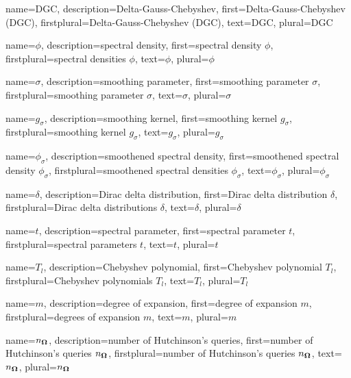 {%
  name={DGC},%
  description={Delta-Gauss-Chebyshev},%
  first={Delta-Gauss-Chebyshev (DGC)},%
  firstplural={Delta-Gauss-Chebyshev (DGC)},%
  text={DGC},%
  plural={DGC}%
}


{%
  name={$\phi$},%
  description={spectral density},%
  first={spectral density $\phi$},%
  firstplural={spectral densities $\phi$},%
  text={$\phi$},%
  plural={$\phi$}%
}

{%
  name={$\sigma$},%
  description={smoothing parameter},%
  first={smoothing parameter $\sigma$},%
  firstplural={smoothing parameter $\sigma$},%
  text={$\sigma$},%
  plural={$\sigma$}%
}

{%
  name={$g_{\sigma}$},%
  description={smoothing kernel},%
  first={smoothing kernel $g_{\sigma}$},%
  firstplural={smoothing kernel $g_{\sigma}$},%
  text={$g_{\sigma}$},%
  plural={$g_{\sigma}$}%
}

{%
  name={$\phi_{\sigma}$},%
  description={smoothened spectral density},%
  first={smoothened spectral density $\phi_{\sigma}$},%
  firstplural={smoothened spectral densities $\phi_{\sigma}$},%
  text={$\phi_{\sigma}$},%
  plural={$\phi_{\sigma}$}%
}

{%
  name={$\delta$},%
  description={Dirac delta distribution},%
  first={Dirac delta distribution $\delta$},%
  firstplural={Dirac delta distributions $\delta$},%
  text={$\delta$},%
  plural={$\delta$}%
}

{%
  name={$t$},%
  description={spectral parameter},%
  first={spectral parameter $t$},%
  firstplural={spectral parameters $t$},%
  text={$t$},%
  plural={$t$}%
}

{%
  name={$T_l$},%
  description={Chebyshev polynomial},%
  first={Chebyshev polynomial $T_l$},%
  firstplural={Chebyshev polynomials $T_l$},%
  text={$T_l$},%
  plural={$T_l$}%
}

{%
  name={$m$},%
  description={degree of expansion},%
  first={degree of expansion $m$},%
  firstplural={degrees of expansion $m$},%
  text={$m$},%
  plural={$m$}%
}

{%
  name={$n_{\boldsymbol{\Omega}}$},%
  description={number of Hutchinson's queries},%
  first={number of Hutchinson's queries $n_{\boldsymbol{\Omega}}$},%
  firstplural={number of Hutchinson's queries $n_{\boldsymbol{\Omega}}$},%
  text={$n_{\boldsymbol{\Omega}}$},%
  plural={$n_{\boldsymbol{\Omega}}$}%
}

